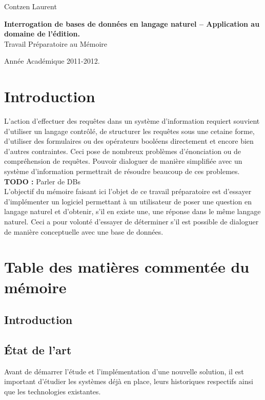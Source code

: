 \documentclass[11pt]{article}
\author{Contzen Laurent}
\begin{document}
\begin{titlepage}  
  \begin{flushleft}
    Contzen Laurent
  \end{flushleft}
  \begin{center}
    \vspace{82mm}\LARGE{\textbf{Interrogation de bases de données en langage naturel – Application au domaine de l’édition.} \\    
      Travail Préparatoire au Mémoire}
  \end{center}
  \begin{flushright}
    \vspace{92mm}
    Année Académique 2011-2012.             
  \end{flushright}
\end{titlepage}

\tableofcontents
\newpage

\section{Introduction}
L'action d'effectuer des requêtes dans un système d'information requiert souvient d'utiliser un langage contrôlé, de structurer les requêtes sous une cetaine forme, d'utiliser des formulaires ou des opérateurs booléens directement et encore bien d'autres contraintes. Ceci pose de nombreux problèmes d'énonciation ou de compréhension de requêtes. Pouvoir dialoguer de manière simplifiée avec un système d'information permettrait de résoudre beaucoup de ces problemes. \colorbox{BrickRed}{\textbf{TODO : } Parler de DBs} \\
L'objectif du mémoire faisant ici l'objet de ce travail préparatoire est d'essayer d'implémenter un logiciel permettant à un utilisateur de poser une question en langage naturel et d'obtenir, s'il en existe une, une réponse dans le même langage naturel. Ceci a pour volonté d'essayer de déterminer s'il est possible de dialoguer de manière conceptuelle avec une base de données.

\section{Table des matières commentée du mémoire}
\subsection{Introduction}
\subsection{État de l'art}
Avant de démarrer l'étude et l'implémentation d'une nouvelle solution, il est important d'étudier les systèmes déjà en place, leurs historiques respectifs ainsi que les technologies existantes.
\end{document}
